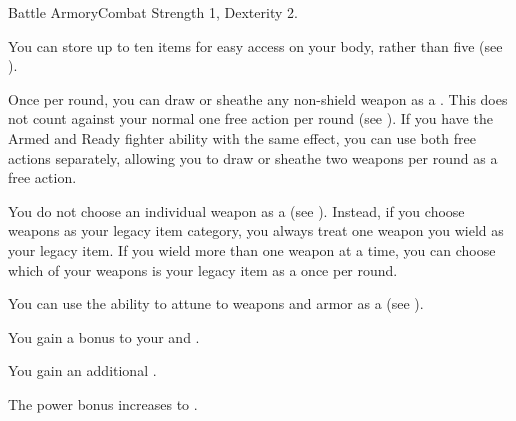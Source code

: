   \begin{feat}{Battle Armory}{Combat}
    \featpre Strength 1, Dexterity 2.

     You can store up to ten items for easy access on your body, rather than five (see ).

     Once per round, you can draw or sheathe any non-shield weapon as a .
    This does not count against your normal one free action  per round (see ).
    If you have the Armed and Ready fighter ability with the same effect, you can use both free actions separately, allowing you to draw or sheathe two weapons per round as a free action.

     You do not choose an individual weapon as a  (see ).
    Instead, if you choose weapons as your legacy item category, you always treat one weapon you wield as your legacy item.
    If you wield more than one weapon at a time, you can choose which of your weapons is your legacy item as a  once per round.

     You can use the  ability to attune to weapons and armor as a  (see ).

     You gain a  bonus to your  and .

     You gain an additional .

     The power bonus increases to .
  \end{feat}

